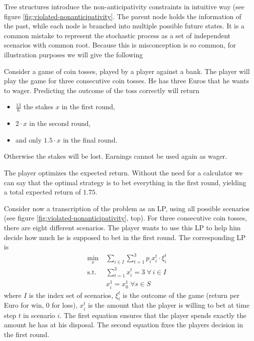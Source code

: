 Tree structures introduce the non-anticipativity constraints in intuitive way (see figure \ref{fig:violated-nonanticipativity}.
The parent node holds the information of the past, while each node is branched into multiple possible future states. 
It is a common mistake to represent the stochastic process as a set of independent scenarios with common root.
Because this is misconception is so common, for illustration purposes we will give the following
\begin{example}
  \label{ex:tree-necessity}
  Consider a game of coin tosses, played by a player against a bank. 
  The player will play the game for three consecutive coin tosses. 
  He has three Euros that he wants to wager. 
  Predicting the outcome of the toss correctly will return 
  \begin{itemize}
  \item $\frac{13}{6}$ the stakes $x$ in the first round,
  \item $2\cdot x$ in the second round,
  \item and only $1.5\cdot x$ in the final round.
  \end{itemize}
  Otherwise the stakes will be lost. 
  Earnings cannot be used again as wager.

  The player optimizes the expected return.
  Without the need for a calculator we can say that the optimal strategy is to bet everything in the first round, yielding a total expected return of $1.75$.

  Consider now a transcription of the problem as an LP, using all possible scenarios (see figure \ref{fig:violated-nonanticipativity}, top).
  For three consecutive coin tosses, there are eight different scenarios.
  The player wants to use this LP to help him decide how much he is supposed to bet in the first round.
  The corresponding LP is
  \begin{align*}
    \min\limits_x &\; \sum_{i\in I}\sum_{t=1}^3p_ix_i^t\cdot \xi_i^t\\
    \text{s.t.} &\; \sum_{t=1}^3x_i^t = 3 \;\forall\, i\in I\\
    & \; x_i^1 = x_0^1\;\forall s\in S
  \end{align*}
  where $I$ is the index set of scenarios, $\xi_i^t$ is the outcome of the game (return per Euro for win, $0$ for loss), $x_i^t$ is the amount that the player is willing to bet at time step $t$ in scenario $i$. The first equation ensures that the player spends exactly the amount he has at his disposal. The second equation fixes the players decision in the first round.


\end{example}
